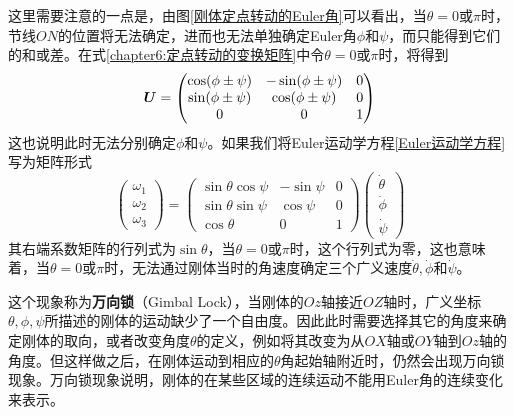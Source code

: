这里需要注意的一点是，由图\ref{刚体定点转动的Euler角}可以看出，当$\theta=0\text{或}\pi$时，节线$ON$的位置将无法确定，进而也无法单独确定Euler角$\phi$和$\psi$，而只能得到它们的和或差。在式\eqref{chapter6:定点转动的变换矩阵}中令$\theta=0\text{或}\pi$时，将得到
\begin{equation*}
	\boldsymbol{U} = \begin{pmatrix}
		\cos(\phi\pm \psi) & -\sin(\phi\pm \psi) & 0 \\
		\sin(\phi\pm \psi) & \cos(\phi\pm \psi) & 0 \\
		0 & 0 & 1
	\end{pmatrix}
\end{equation*}
这也说明此时无法分别确定$\phi$和$\psi$。如果我们将Euler运动学方程\eqref{Euler运动学方程}写为矩阵形式
\begin{equation*}
	\begin{pmatrix}
		\omega_1 \\ \omega_2 \\ \omega_3
	\end{pmatrix} = \begin{pmatrix}
		\sin\theta\cos\psi & -\sin\psi & 0 \\
		\sin\theta\sin\psi & \cos\psi & 0 \\
		\cos\theta & 0 & 1
	\end{pmatrix} \begin{pmatrix} \dot{\theta} \\ \dot{\phi} \\ \dot{\psi} \end{pmatrix}
\end{equation*}
其右端系数矩阵的行列式为$\sin\theta$，当$\theta=0$或$\pi$时，这个行列式为零，这也意味着，当$\theta=0$或$\pi$时，无法通过刚体当时的角速度确定三个广义速度$\dot{\theta},\dot{\phi}$和$\dot{\psi}$。

这个现象称为{\bf 万向锁}（Gimbal Lock），当刚体的$Oz$轴接近$OZ$轴时，广义坐标$\theta,\phi,\psi$所描述的刚体的运动缺少了一个自由度。因此此时需要选择其它的角度来确定刚体的取向，或者改变角度$\theta$的定义，例如将其改变为从$OX$轴或$OY$轴到$Oz$轴的角度。但这样做之后，在刚体运动到相应的$\theta$角起始轴附近时，仍然会出现万向锁现象。万向锁现象说明，刚体的在某些区域的连续运动不能用Euler角的连续变化来表示。


